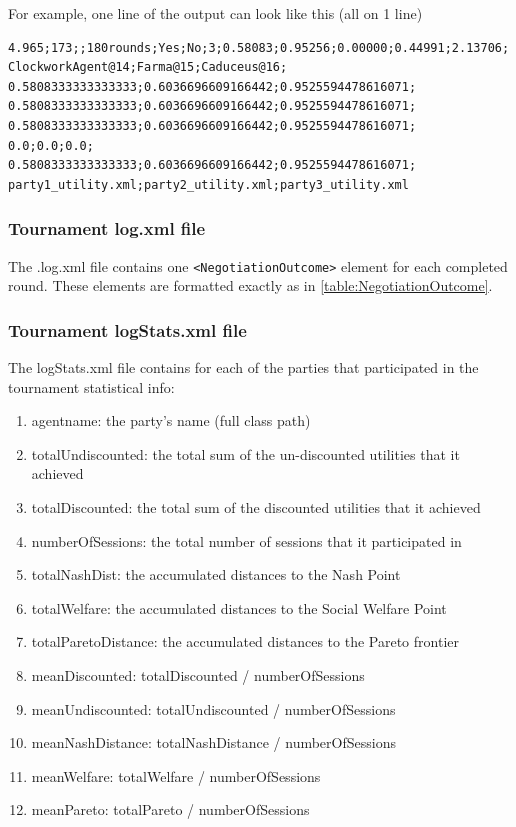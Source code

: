 \documentclass[]{llncs}
\begin{document}
For example, one line of the output can look like this (all on 1 line)

\begin{verbatim}
4.965;173;;180rounds;Yes;No;3;0.58083;0.95256;0.00000;0.44991;2.13706;
ClockworkAgent@14;Farma@15;Caduceus@16;
0.5808333333333333;0.6036696609166442;0.9525594478616071;
0.5808333333333333;0.6036696609166442;0.9525594478616071;
0.5808333333333333;0.6036696609166442;0.9525594478616071;
0.0;0.0;0.0;
0.5808333333333333;0.6036696609166442;0.9525594478616071;
party1_utility.xml;party2_utility.xml;party3_utility.xml
\end{verbatim}

\subsubsection{Tournament log.xml file}

The .log.xml file contains one \verb|<NegotiationOutcome>| element for each completed round.
These elements are formatted exactly as in \ref{table:NegotiationOutcome}.

\subsubsection{Tournament logStats.xml file}
The logStats.xml file contains for each of the parties that participated in the tournament statistical info:

\begin{enumerate}
\item agentname: the party's name (full class path)
\item totalUndiscounted: the total sum of the un-discounted utilities that it achieved
\item totalDiscounted: the total sum of the discounted utilities that it achieved
\item numberOfSessions: the total number of sessions that it participated in
\item totalNashDist: the accumulated distances to the Nash Point
\item totalWelfare: the accumulated distances to the Social Welfare Point
\item totalParetoDistance: the accumulated distances to the Pareto frontier
\item meanDiscounted: totalDiscounted /  numberOfSessions
\item meanUndiscounted: totalUndiscounted /  numberOfSessions
\item meanNashDistance: totalNashDistance /  numberOfSessions
\item meanWelfare: totalWelfare /  numberOfSessions
\item meanPareto: totalPareto /  numberOfSessions
\end{enumerate}
\end{document}
